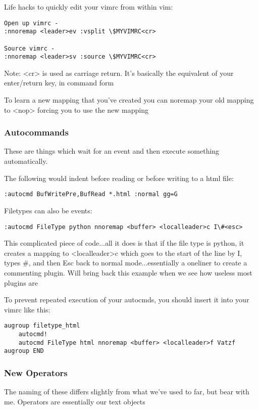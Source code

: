 \documentclass[12pt, letterpaper]{article}
\begin{document}
Life hacks to quickly edit your vimrc from within vim:

\begin{verbatim}
Open up vimrc - 
:nnoremap <leader>ev :vsplit \$MYVIMRC<cr>

Source vimrc - 
:nnoremap <leader>sv :source \$MYVIMRC<cr>
\end{verbatim}

Note: <cr> is used as carriage return. It's basically the equivalent of your
enter/return key, in command form

To learn a new mapping that you've created you can noremap your old mapping to
<nop>  forcing you to use the new mapping

\subsubsection{Autocommands}
These are things which wait for an event and then execute something
automatically. 

The following would indent before reading or before writing to a html file: 
\begin{verbatim}
:autocmd BufWritePre,BufRead *.html :normal gg=G
\end{verbatim}

Filetypes can also be events:
\begin{verbatim}
:autocmd FileType python nnoremap <buffer> <localleader>c I\#<esc>
\end{verbatim}

This complicated piece of code...all it does is that if the file type is
python, it creates a mapping to <localleader>c which goes to the start of the
line by I, types \#, and then Esc back to normal mode...essentially a oneliner
to create a commenting plugin. Will bring back this example when we see how
useless most plugins are


To prevent repeated execution of your autocmds, you should insert it into your
vimrc like this:
\begin{verbatim}
augroup filetype_html
    autocmd!
    autocmd FileType html nnoremap <buffer> <localleader>f Vatzf
augroup END
\end{verbatim}

\subsubsection{New Operators}
The naming of these differs slightly from what we've used to far, but bear with
me. Operators are essentially our text objects
\end{document}
